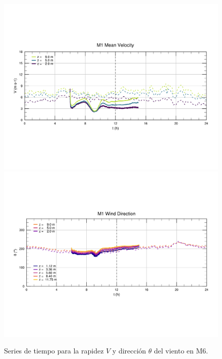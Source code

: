 \begin{figure}[H]
	\centering
	\includegraphics[width=0.87\linewidth,page=6,trim={9mm 57mm 10mm 60mm},clip]{Imagenes/06/bol/ts_interpol_compare.pdf}\\%
	\includegraphics[width=0.87\linewidth,page=6,trim={12mm 52mm 10mm 60mm},clip]{Imagenes/06/bol/ts_interpol_compare_o.pdf}%
	\vspace{-2mm}\caption{Series de tiempo para la rapidez $V$ y dirección $\theta$ del viento en M6.}
	\label{fig:06_bol_ts_m6}
\end{figure}
\vspace*{\fill}
\newpage
\vspace*{\fill}
